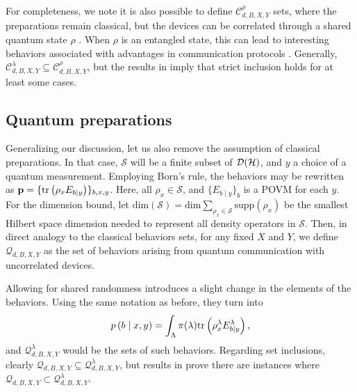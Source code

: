             For completeness, we note it is also possible to define $\mathcal{C}_{d,B,X,Y}^{\rho}$ sets, where the preparations remain classical, but the devices can be correlated through a shared quantum state $\rho$ \cite{tavakoli_eapam_2021,poderini_pamcriteria_2020}. When $\rho$ is an entangled state, this can lead to interesting behaviors associated with advantages in communication protocols \cite{pawlowski_earacs_2010}. Generally, $\mathcal{C}^\lambda_{d,B,X,Y} \subseteq \mathcal{C}^\rho_{d,B,X,Y}$, but the results in \cite{pawlowski_earacs_2010} imply that strict inclusion holds for at least some cases.

    
        \subsection{Quantum preparations}
        \label{sec:quantum-behaviors}

            Generalizing our discussion, let us also remove the assumption of classical preparations. In that case, $\mathcal{S}$ will be a finite subset of $\mathcal{D}(\mathcal{H})$, and $y$ a choice of a quantum measurement. Employing Born's rule, the behaviors may be rewritten as $\mathbf{p} = \{ \text{tr}\left( \rho_x E_{b \vert y} \right) \}_{b,x,y}$. Here, all $\rho_x \in \mathcal{S}$, and $\{ E_{b \mid y} \}_b$ is a POVM for each $y$. For the dimension bound, let $\text{dim}(\mathcal{S}) = \text{dim} \sum_{\rho_x \in \mathcal{S}}\text{supp}\left( \rho_x \right)$ be the smallest Hilbert space dimension needed to represent all density operators in $\mathcal{S}$. Then, in direct analogy to the classical behaviors sets, for any fixed $X$ and $Y$, we define $\mathcal{Q}_{d,B,X,Y}$ as the set of behaviors arising from quantum communication with uncorrelated devices.
            
            Allowing for shared randomness introduces a slight change in the elements of the behaviors. Using the same notation as before, they turn into
            $$
                p \left( b \mid x,y \right) =  \int_\Lambda \pi(\lambda) \text{tr}\left( \rho_x^\lambda E_{b \vert y}^\lambda \right) ,
            $$
			and $\mathcal{Q}^\lambda_{d,B,X,Y}$ would be the sets of such behaviors. Regarding set inclusions, clearly $\mathcal{Q}_{d,B,X,Y} \subseteq \mathcal{Q}^\lambda_{d,B,X,Y}$, but results in \cite{ambainis_srqracs_2009} prove there are instances where $\mathcal{Q}_{d,B,X,Y} \subset \mathcal{Q}^\lambda_{d,B,X,Y}$.
            
